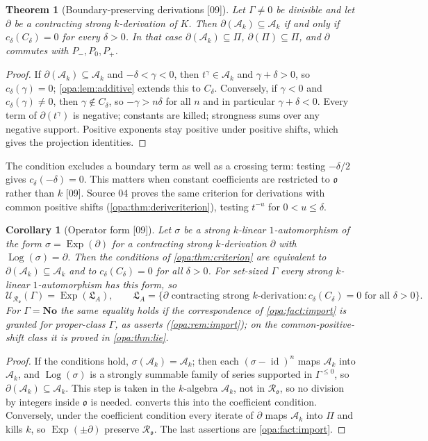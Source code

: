 \documentclass[11pt,oneside]{article}
\numberwithin{equation}{section}
\newtheorem{theorem}{Theorem}[section]
\newtheorem{corollary}[corollary]{Corollary}
\theoremstyle{definition}
\theoremstyle{remark}
\newcommand{\No}{\mathbf{No}}
\newcommand{\oo}{\mathfrak o}
\newcommand{\Ak}{\mathcal A_k}
\newcommand{\Ro}{\mathcal R_{\oo}}
\newcommand{\LL}{\mathfrak L}
\newcommand{\UU}{\mathcal U}
\newcommand{\id}{\operatorname{id}}
\newcommand{\Exp}{\operatorname{Exp}}
\newcommand{\Log}{\operatorname{Log}}
\newcommand{\src}[1]{\textup{\textsf{\small[#1]}}}
\begin{document}
\begin{theorem}[Boundary-preserving derivations \src{09}]\label{opa:thm:derivation}
Let $\Gamma\ne0$ be divisible and let $\partial$ be a contracting strong
$k$-derivation of $K$. Then $\partial(\Ak)\subseteq\Ak$ if and only if
$c_\delta(C_\delta)=0$ for every $\delta>0$. In that case
$\partial(\Ak)\subseteq\Pi$, $\partial(\Pi)\subseteq\Pi$, and $\partial$ commutes
with $P_-,P_0,P_+$.
\end{theorem}
\begin{proof}
If $\partial(\Ak)\subseteq\Ak$ and $-\delta<\gamma<0$, then $t^\gamma\in\Ak$ and
$\gamma+\delta>0$, so $c_\delta(\gamma)=0$; \cref{opa:lem:additive} extends this
to $C_\delta$. Conversely, if $\gamma<0$ and $c_\delta(\gamma)\ne0$, then
$\gamma\notin C_\delta$, so $-\gamma>n\delta$ for all $n$ and in particular
$\gamma+\delta<0$. Every term of $\partial(t^\gamma)$ is negative; constants are
killed; strongness sums over any negative support. Positive exponents stay
positive under positive shifts, which gives the projection identities.
\end{proof}

The condition excludes a boundary term as well as a crossing term: testing
$-\delta/2$ gives $c_\delta(-\delta)=0$. This matters when constant
coefficients are restricted to $\oo$ rather than $k$ \src{09}. Source 04
proves the same criterion for derivations with common positive shifts
(\cref{opa:thm:derivcriterion}), testing $t^{-u}$ for $0<u\le\delta$.

\begin{corollary}[Operator form \src{09}]\label{opa:cor:operator}
Let $\sigma$ be a strong $k$-linear $1$-automorphism of the form
$\sigma=\Exp(\partial)$ for a contracting strong $k$-derivation $\partial$ with
$\Log(\sigma)=\partial$. Then the conditions of \cref{opa:thm:criterion} are
equivalent to $\partial(\Ak)\subseteq\Ak$ and to $c_\delta(C_\delta)=0$ for all
$\delta>0$. For set-sized $\Gamma$ every strong $k$-linear $1$-automorphism
has this form, so
\[
 \UU_{\Ro}(\Gamma)=\Exp(\LL_A),\qquad
 \LL_A=\{\partial\text{ contracting strong }k\text{-derivation}:
 c_\delta(C_\delta)=0\text{ for all }\delta>0\}.
\]
For $\Gamma=\No$ the same equality holds if the correspondence of
\cref{opa:fact:import} is granted for proper-class $\Gamma$, as \cite[Fact
4.2]{KKS} asserts (\cref{opa:rem:import}); on the common-positive-shift
class it is proved in \cref{opa:thm:lie}.
\end{corollary}
\begin{proof}
If the conditions hold, $\sigma(\Ak)=\Ak$; then each $(\sigma-\id)^n$ maps $\Ak$
into $\Ak$, and $\Log(\sigma)$ is a strongly summable family of series
supported in $\Gamma^{\le0}$, so $\partial(\Ak)\subseteq\Ak$. This step is taken
in the $k$-algebra $\Ak$, not in $\Ro$, so no division by integers inside
$\oo$ is needed.  converts this into the coefficient
condition. Conversely, under the coefficient condition every iterate of
$\partial$ maps $\Ak$ into $\Pi$ and kills $k$, so $\Exp(\pm\partial)$ preserve
$\Ro$. The last assertions are \cref{opa:fact:import}.
\end{proof}
\end{document}
